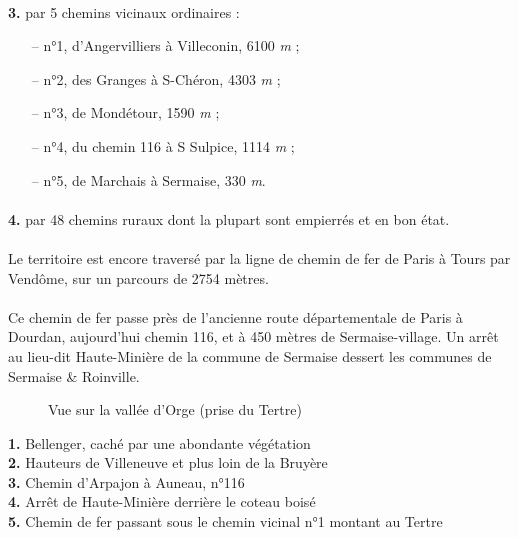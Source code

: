 \documentclass[../eBook.tex]{subfiles}
\begin{document}
    \paragraph{}\textbf{3.} par 5 chemins vicinaux ordinaires :
    \begin{itemize}[noitemsep]
      \setlength{\baselineskip}{16pt}
      \item[--] n°1, d'Angervilliers à Villeconin, 6100 \textit{m} ;
      \item[--] n°2, des Granges à S-Chéron, 4303 \textit{m} ;
      \item[--] n°3, de Mondétour, 1590 \textit{m} ;
      \item[--] n°4, du chemin 116 à S Sulpice, 1114 \textit{m} ;
      \item[--] n°5, de Marchais à Sermaise, 330 \textit{m}.
    \end{itemize}
    \paragraph{}\textbf{4.} par 48 chemins ruraux dont la plupart sont empierrés et en bon état.
    \paragraph{}Le territoire est encore traversé par la ligne de chemin de fer de Paris à Tours par Vendôme, sur un parcours de 2754 mètres.
    \paragraph{}Ce chemin de fer passe près de l'ancienne route départementale de Paris à Dourdan, aujourd'hui chemin 116, et à 450 mètres de Sermaise-village. Un arrêt au lieu-dit Haute-Minière de la commune de Sermaise dessert les communes de Sermaise \& Roinville.
    \newpage
    \begin{center}
      \begin{figure}[!ht]
        \caption*{Vue sur la vallée d'Orge (prise du Tertre)}
      \end{figure}
    \end{center}
    \small{}
    \noindent\textbf{1.} Bellenger, caché par une abondante végétation\\
    \textbf{2.} Hauteurs de Villeneuve et plus loin de la Bruyère\\
    \textbf{3.} Chemin d'Arpajon à Auneau, n°116\\
    \textbf{4.} Arrêt de Haute-Minière derrière le coteau boisé\\
    \textbf{5.} Chemin de fer passant sous le chemin vicinal n°1 montant au Tertre
    \normalsize{}
\end{document}
